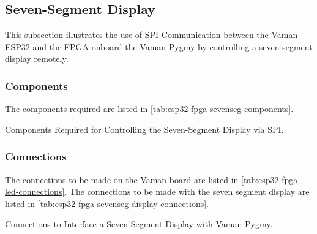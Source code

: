\subsection{Seven-Segment Display}
This subsection illustrates the use of SPI Communication between the Vaman-ESP32
and the FPGA onboard the Vaman-Pygmy by controlling a seven segment display 
remotely.

\subsubsection{Components}
The components required are listed in
\autoref{tab:esp32-fpga-sevenseg-components}.
\begin{table}[!ht]
    \centering
    
    \caption{Components Required for Controlling the Seven-Segment Display via SPI.}
    \label{tab:esp32-fpga-sevenseg-components}
\end{table}

\subsubsection{Connections}
The connections to be made on the Vaman board are listed in
\autoref{tab:esp32-fpga-led-connections}. The connections to be made with the
seven segment display are listed in
\autoref{tab:esp32-fpga-sevenseg-display-connections}.

\begin{table}[!ht]
    \centering
    
    \caption{Connections to Interface a Seven-Segment Display with Vaman-Pygmy.}
    \label{tab:esp32-fpga-sevenseg-display-connections}
\end{table}

